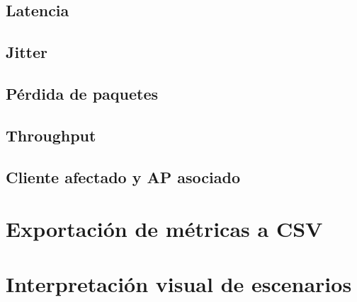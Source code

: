 \subsection{Latencia}
\label{subsec:latencia-visualizada}

\subsection{Jitter}
\label{subsec:jitter-visualizado}

\subsection{Pérdida de paquetes}
\label{subsec:perdida-paquetes-visualizada}

\subsection{Throughput}
\label{subsec:throughput-visualizado}

\subsection{Cliente afectado y AP asociado}
\label{subsec:cliente-afectado-ap-asociado}


\section{Exportación de métricas a CSV}
\label{sec:exportacion-metricas-csv}


\section{Interpretación visual de escenarios}
\label{sec:interpretacion-visual-escenarios}